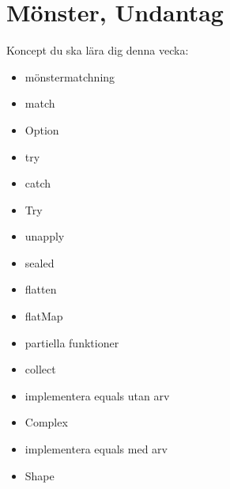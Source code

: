 \chapter{Mönster, Undantag}\label{chapter:W08}
Koncept du ska lära dig denna vecka:
\begin{multicols}{2}\begin{itemize}[nosep,label={$\square$},leftmargin=*]
\item mönstermatchning
\item match
\item Option
\item try
\item catch
\item Try
\item unapply
\item sealed
\item flatten
\item flatMap
\item partiella funktioner
\item collect
\item implementera equals utan arv
\item Complex
\item implementera equals med arv
\item Shape\end{itemize}\end{multicols}
